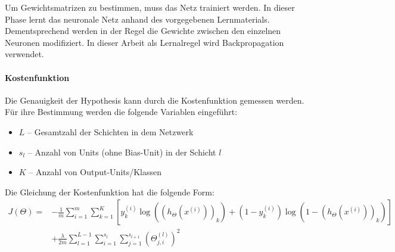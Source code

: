 Um Gewichtsmatrizen zu bestimmen, muss das Netz trainiert werden. In dieser Phase lernt das neuronale Netz anhand des vorgegebenen Lernmaterials. Dementsprechend werden in der Regel die Gewichte zwischen den einzelnen Neuronen modifiziert. In dieser Arbeit als Lernalregel wird Backpropagation verwendet.

\paragraph{Kostenfunktion\\}
Die Genauigkeit der Hypothesis kann durch die Kostenfunktion gemessen werden. F\"ur ihre Bestimmung werden die folgende Variablen eingef\"uhrt:
\begin{itemize}
\item $L$ -- Gesamtzahl der Schichten in dem Netzwerk
\item $s_l$ -- Anzahl von Units (ohne Bias-Unit) in der Schicht $l$
\item $K$ -- Anzahl von Output-Units/Klassen
\end{itemize}
Die Gleichung der Kostenfunktion hat die folgende Form:
\begin{align}
J(\Theta) = &- \frac{1}{m} \sum_{i=1}^m \sum_{k=1}^K \left[y^{(i)}_k \log ((h_\Theta (x^{(i)}))_k) + (1 - y^{(i)}_k)\log (1 - (h_\Theta(x^{(i)}))_k)\right] \nonumber \\
&+ \frac{\lambda}{2m}\sum_{l=1}^{L-1} \sum_{i=1}^{s_l} \sum_{j=1}^{s_{l+1}} ( \Theta_{j,i}^{(l)})^2
\end{align}

